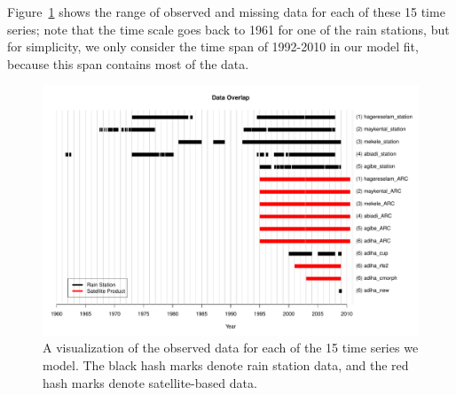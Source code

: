 \documentclass[12pt]{article}
\begin{document}
Figure~\ref{fig_overlap} shows the range of observed and missing data for each of these 15 time series; note that the time scale goes back to 1961 for one of the rain stations, but for simplicity, we only consider the time span of 1992-2010 in our model fit, because this span contains most of the data.

\begin{figure}[htbp]
\begin{center}
\includegraphics[width=5.0in]{fig_observed_data_new.pdf}
\caption{A visualization of the observed data for each of the 15 time series we model. The black hash marks denote rain station data, and the red hash marks denote satellite-based data.}
\label{fig_overlap}
\end{center}
\end{figure}
\end{document}
